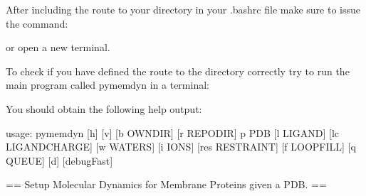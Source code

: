 \documentclass[letterpaper,10pt,english]{sphinxmanual}
\begin{document}
\begin{enumerate}
\sphinxAtStartPar
After including the route to your  directory in your
.bashrc file make sure to issue the command:

\begin{sphinxVerbatim}[commandchars=\\\{\}]
 
\end{sphinxVerbatim}

\sphinxAtStartPar
or open a new terminal.

\sphinxAtStartPar
To check if you have defined the route to the  directory
correctly try to run the main program called pymemdyn in a terminal:

\begin{sphinxVerbatim}[commandchars=\\\{\}]
 
\end{sphinxVerbatim}

\sphinxAtStartPar
You should obtain the following help output:

\begin{sphinxVerbatim}[commandchars=\\\{\}]
usage: pymemdyn [\PYGZhy{}h] [\PYGZhy{}v] [\PYGZhy{}b OWN\PYGZus{}DIR] [\PYGZhy{}r REPO\PYGZus{}DIR] \PYGZhy{}p PDB [\PYGZhy{}l LIGAND]
             [\PYGZhy{}\PYGZhy{}lc LIGAND\PYGZus{}CHARGE] [\PYGZhy{}w WATERS] [\PYGZhy{}i IONS] [\PYGZhy{}\PYGZhy{}res RESTRAINT]
             [\PYGZhy{}f LOOP\PYGZus{}FILL] [\PYGZhy{}q QUEUE] [\PYGZhy{}d] [\PYGZhy{}\PYGZhy{}debugFast]

== Setup Molecular Dynamics for Membrane Proteins given a PDB. ==


\end{sphinxVerbatim}
\end{enumerate}
\end{document}
